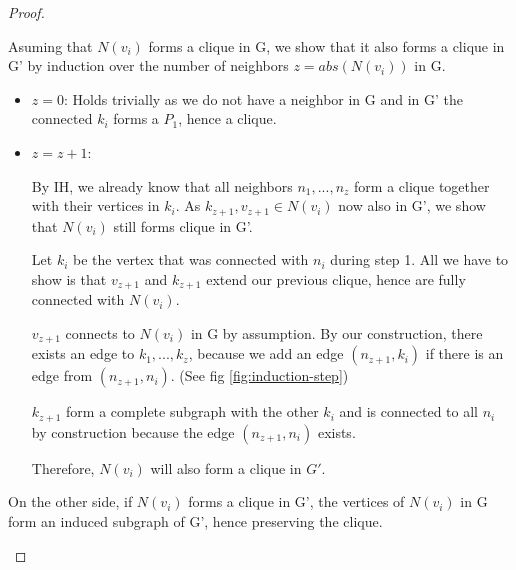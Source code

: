 \begin{proof}
\begin{subproof}
        Asuming that $N(v_i)$ forms a clique in G, we show that it also forms a clique in G' by induction over the number of neighbors $z = abs(N(v_i))$ in G.

        \begin{itemize}
            \item $z = 0$: Holds trivially as we do not have a neighbor in G and in G' the connected $k_i$ forms a $P_1$, hence a clique.
            \item $z = z + 1$: 

            By IH, we already know that all neighbors $n_1,...,n_z$ form a clique together with their vertices in $k_{i}$. As $k_{z+1}, v_{z+1} \in N(v_i)$ now also in G', we show that $N(v_i)$ still forms clique in G'.

            Let $k_i$ be the vertex that was connected with $n_i$ during step 1. All we have to show is that $v_{z+1}$ and $k_{z+1}$ extend our previous clique, hence are fully connected with $N(v_i)$.
            
            $v_{z+1}$ connects to $N(v_i)$ in G by assumption. By our construction, there exists an edge to $k_1,...,k_z$, because we add an edge $(n_{z+1}, k_i)$ if there is an edge from $(n_{z+1}, n_i)$. (See fig \ref{fig:induction-step})

            $k_{z+1}$ form a complete subgraph with the other $k_i$ and is connected to all $n_i$ by construction because the edge $(n_{z+1},n_i)$ exists.  


            Therefore, $N(v_i)$ will also form a clique in $G'$.
        \end{itemize}

        On the other side, if $N(v_i)$ forms a clique in G', the vertices of $N(v_i)$ in G form an induced subgraph of G', hence preserving the clique.
        
    \end{subproof}
   

\end{proof}
